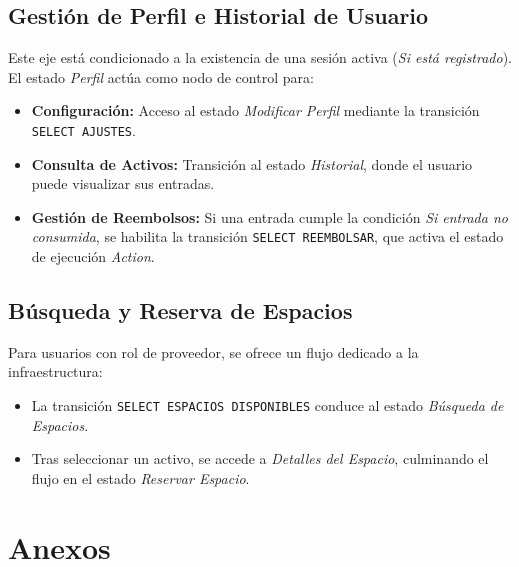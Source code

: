 \documentclass[12pt,a4paper]{article}
\begin{document}
\subsection{Gestión de Perfil e Historial de Usuario}
Este eje está condicionado a la existencia de una sesión activa (\textit{Si está registrado}). El estado \textit{Perfil} actúa como nodo de control para:
\begin{itemize}
    \item \textbf{Configuración:} Acceso al estado \textit{Modificar Perfil} mediante la transición \texttt{SELECT AJUSTES}.
    \item \textbf{Consulta de Activos:} Transición al estado \textit{Historial}, donde el usuario puede visualizar sus entradas.
    \item \textbf{Gestión de Reembolsos:} Si una entrada cumple la condición \textit{Si entrada no consumida}, se habilita la transición \texttt{SELECT REEMBOLSAR}, que activa el estado de ejecución \textit{Action}.
\end{itemize}

\subsection{Búsqueda y Reserva de Espacios}
Para usuarios con rol de proveedor, se ofrece un flujo dedicado a la infraestructura:
\begin{itemize}
    \item La transición \texttt{SELECT ESPACIOS DISPONIBLES} conduce al estado \textit{Búsqueda de Espacios}.
    \item Tras seleccionar un activo, se accede a \textit{Detalles del Espacio}, culminando el flujo en el estado \textit{Reservar Espacio}.
\end{itemize}



\section{Anexos}
\end{document}
